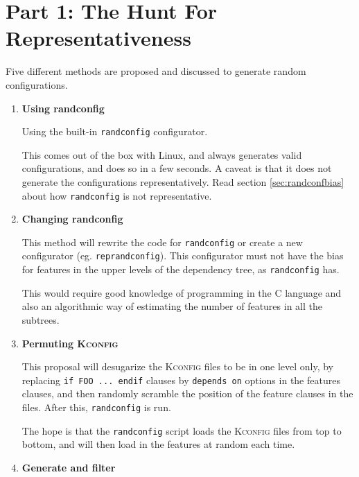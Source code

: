 \documentclass[a4paper,11pt]{report}
\newcommand{\textcode}[1]{\fboxsep=1pt\texttt{\colorbox{gray!20}{#1}}}
\begin{document}
        \section{Part 1: The Hunt For Representativeness}
        \label{rephunt}


Five different methods are proposed and discussed to generate random 
configurations.

\begin{enumerate}

    \item \textbf{Using randconfig}

Using the built-in \texttt{randconfig} configurator.

This comes out of the box with Linux, and always generates valid configurations,
and does so in a few seconds. A caveat is that it does not generate the 
configurations representatively. Read section \ref{sec:randconfbias} about how 
\texttt{randconfig} is not representative.


    \item \textbf{Changing randconfig}

This method will rewrite the code for \texttt{randconfig} or create a new 
configurator (eg. \texttt{reprandconfig}).  This configurator must not have the 
bias for features in the upper levels of the dependency tree, as 
\texttt{randconfig} has.

This would require good knowledge of programming in the \textsc{C} language
and also an algorithmic way of estimating the number of features in all the 
subtrees.


    \item \textbf{Permuting \textsc{Kconfig}}


This proposal will desugarize the \textsc{Kconfig} files to be in one level 
only, by replacing \textcode{if FOO ... endif} clauses by \textcode{depends on} 
options in the features clauses, and then randomly scramble the position of 
the feature clauses in the files. After this, \texttt{randconfig} is run.

The hope is that the \texttt{randconfig} script loads the \textsc{Kconfig} 
files from top to bottom, and will then load in the features at random each 
time.


    \item \textbf{Generate and filter}

            \def \fn {It also is aware about \texttt{choice} clauses}


\end{enumerate}
\end{document}
